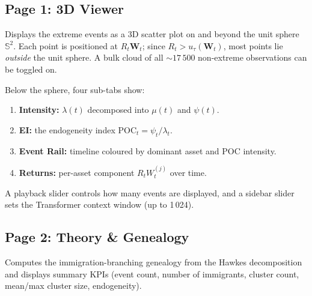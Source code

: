 \documentclass[11pt,a4paper]{article}
\newcommand{\bW}{\boldsymbol{W}}
\begin{document}
\subsection{Page 1: 3D Viewer}

Displays the extreme events as a 3D scatter plot on and beyond
the unit sphere $\mathbb{S}^2$.
Each point is positioned at $R_t \bW_t$; since $R_t > u_\tau(\bW_t)$,
most points lie \emph{outside} the unit sphere.
A bulk cloud of all ${\sim}17\,500$ non-extreme observations
can be toggled on.

Below the sphere, four sub-tabs show:
\begin{enumerate}[nosep]
  \item \textbf{Intensity:} $\lambda(t)$ decomposed into $\mu(t)$ and $\psi(t)$.
  \item \textbf{EI:} the endogeneity index $\text{POC}_t = \psi_t / \lambda_t$.
  \item \textbf{Event Rail:} timeline coloured by dominant asset and
        POC intensity.
  \item \textbf{Returns:} per-asset component $R_t W_t^{(j)}$ over time.
\end{enumerate}

A playback slider controls how many events are displayed, and a sidebar
slider sets the Transformer context window (up to 1\,024).

\subsection{Page 2: Theory \& Genealogy}

Computes the immigration-branching genealogy from the Hawkes
decomposition and displays summary KPIs (event count, number of
immigrants, cluster count, mean/max cluster size, endogeneity).
\end{document}
